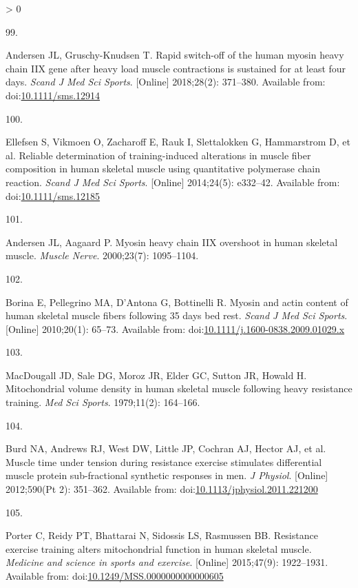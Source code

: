 \documentclass[twoside,10pt]{gihclass} %
\newlength{\cslhangindent}
\newlength{\csllabelwidth}
\newenvironment{CSLReferences}[3] %
 {%
  \setlength{\parindent}{0pt}
  \ifodd #1 \everypar{\setlength{\hangindent}{\cslhangindent}}\ignorespaces\fi
  \ifnum #2 > 0
  \setlength{\parskip}{#2\baselineskip}
  \fi
 }%
 {}
\newcommand{\CSLLeftMargin}[1]{\parbox[t]{\maxof{\widthof{#1}}{\csllabelwidth}}{#1}}
\newcommand{\CSLRightInline}[1]{\parbox[t]{\linewidth}{#1}}
\begin{document}
\begin{CSLReferences}{0}{0}
\leavevmode\hypertarget{ref-RN2056}{}%
\CSLLeftMargin{99. }
\CSLRightInline{Andersen JL, Gruschy-Knudsen T. Rapid switch-off of the human myosin heavy chain IIX gene after heavy load muscle contractions is sustained for at least four days. \emph{Scand J Med Sci Sports}. {[}Online{]} 2018;28(2): 371--380. Available from: doi:\href{https://doi.org/10.1111/sms.12914}{10.1111/sms.12914}}

\leavevmode\hypertarget{ref-RN1489}{}%
\CSLLeftMargin{100. }
\CSLRightInline{Ellefsen S, Vikmoen O, Zacharoff E, Rauk I, Slettalokken G, Hammarstrom D, et al. Reliable determination of training-induced alterations in muscle fiber composition in human skeletal muscle using quantitative polymerase chain reaction. \emph{Scand J Med Sci Sports}. {[}Online{]} 2014;24(5): e332--42. Available from: doi:\href{https://doi.org/10.1111/sms.12185}{10.1111/sms.12185}}

\leavevmode\hypertarget{ref-RN2057}{}%
\CSLLeftMargin{101. }
\CSLRightInline{Andersen JL, Aagaard P. Myosin heavy chain IIX overshoot in human skeletal muscle. \emph{Muscle Nerve}. 2000;23(7): 1095--1104. }

\leavevmode\hypertarget{ref-RN2108}{}%
\CSLLeftMargin{102. }
\CSLRightInline{Borina E, Pellegrino MA, D'Antona G, Bottinelli R. Myosin and actin content of human skeletal muscle fibers following 35 days bed rest. \emph{Scand J Med Sci Sports}. {[}Online{]} 2010;20(1): 65--73. Available from: doi:\href{https://doi.org/10.1111/j.1600-0838.2009.01029.x}{10.1111/j.1600-0838.2009.01029.x}}

\leavevmode\hypertarget{ref-RN2732}{}%
\CSLLeftMargin{103. }
\CSLRightInline{MacDougall JD, Sale DG, Moroz JR, Elder GC, Sutton JR, Howald H. Mitochondrial volume density in human skeletal muscle following heavy resistance training. \emph{Med Sci Sports}. 1979;11(2): 164--166. }

\leavevmode\hypertarget{ref-RN1505}{}%
\CSLLeftMargin{104. }
\CSLRightInline{Burd NA, Andrews RJ, West DW, Little JP, Cochran AJ, Hector AJ, et al. Muscle time under tension during resistance exercise stimulates differential muscle protein sub-fractional synthetic responses in men. \emph{J Physiol}. {[}Online{]} 2012;590(Pt 2): 351--362. Available from: doi:\href{https://doi.org/10.1113/jphysiol.2011.221200}{10.1113/jphysiol.2011.221200}}

\leavevmode\hypertarget{ref-RN2608}{}%
\CSLLeftMargin{105. }
\CSLRightInline{Porter C, Reidy PT, Bhattarai N, Sidossis LS, Rasmussen BB. Resistance exercise training alters mitochondrial function in human skeletal muscle. \emph{Medicine and science in sports and exercise}. {[}Online{]} 2015;47(9): 1922--1931. Available from: doi:\href{https://doi.org/10.1249/MSS.0000000000000605}{10.1249/MSS.0000000000000605}}


\end{CSLReferences}
\end{document}

